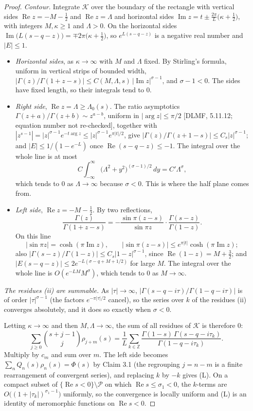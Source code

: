 \documentclass[11pt]{article}
\newcommand{\re}{\operatorname{Re}}
\newcommand{\im}{\operatorname{Im}}
\begin{document}
\begin{proof}
\emph{Contour.} Integrate $\mathcal{K}$ over the boundary of the rectangle with vertical sides $\re z=-M-\frac12$ and $\re z=\Lambda$ and horizontal sides $\im z=t\pm\frac{2\pi}{L}\bigl(\kappa+\frac12\bigr)$, with integers $M,\kappa\ge1$ and $\Lambda>0$. On the horizontal sides $\im\bigl(L(s-q-z)\bigr)=\mp2\pi\bigl(\kappa+\frac12\bigr)$, so $e^{L(s-q-z)}$ is a negative real number and $|E|\le1$.
\begin{itemize}
\item \emph{Horizontal sides}, as $\kappa\to\infty$ with $M$ and $\Lambda$ fixed. By Stirling's formula, uniform in vertical strips of bounded width, $|\Gamma(z)/\Gamma(1+z-s)|\le C(M,\Lambda,s)\,|\im z|^{\sigma-1}$, and $\sigma-1<0$. The sides have fixed length, so their integrals tend to $0$.
\item \emph{Right side}, $\re z=\Lambda\ge\Lambda_0(s)$. The ratio asymptotics $\Gamma(z+a)/\Gamma(z+b)\sim z^{a-b}$, uniform in $|\arg z|\le\pi/2$ [DLMF, 5.11.12; equation number not re-checked], together with $|z^{s-1}|=|z|^{\sigma-1}e^{-t\arg z}\le|z|^{\sigma-1}e^{\pi|t|/2}$, give $|\Gamma(z)/\Gamma(z+1-s)|\le C_s|z|^{\sigma-1}$; and $|E|\le1/(1-e^{-L})$ once $\re(s-q-z)\le-1$. The integral over the whole line is at most
\[
C\int_{-\infty}^{\infty}\bigl(\Lambda^2+y^2\bigr)^{(\sigma-1)/2}\,dy=C'\Lambda^{\sigma},
\]
which tends to $0$ as $\Lambda\to\infty$ because $\sigma<0$. This is where the half plane comes from.
\item \emph{Left side}, $\re z=-M-\frac12$. By two reflections,
\[
\frac{\Gamma(z)}{\Gamma(1+z-s)}=-\frac{\sin\pi(z-s)}{\sin\pi z}\cdot\frac{\Gamma(s-z)}{\Gamma(1-z)}.
\]
On this line
\[
|\sin\pi z|=\cosh(\pi\im z),\qquad|\sin\pi(z-s)|\le e^{\pi|t|}\cosh(\pi\im z);
\]
also $|\Gamma(s-z)/\Gamma(1-z)|\le C_s|1-z|^{\sigma-1}$, since $\re(1-z)=M+\frac32$; and $|E(s-q-z)|\le2e^{-L(\sigma-q+M+1/2)}$ for large $M$. The integral over the whole line is $O(e^{-LM}M^{\sigma})$, which tends to $0$ as $M\to\infty$.
\end{itemize}

\emph{The residues (ii) are summable.} As $|\tau|\to\infty$, $|\Gamma(s-q-i\tau)/\Gamma(1-q-i\tau)|$ is of order $|\tau|^{\sigma-1}$ (the factors $e^{-\pi|\tau|/2}$ cancel), so the series over $k$ of the residues (ii) converges absolutely, and it does so exactly when $\sigma<0$.

Letting $\kappa\to\infty$ and then $M,\Lambda\to\infty$, the sum of all residues of $\mathcal{K}$ is therefore $0$:
\[
\sum_{j\ge0}\binom{s+j-1}{j}\rho_{j+m}(s)=\frac1L\sum_{k\in\mathbb{Z}}\frac{\Gamma(1-s)\,\Gamma(s-q-i\tau_k)}{\Gamma(1-q-i\tau_k)}.
\]
Multiply by $c_m$ and sum over $m$. The left side becomes $\sum_nQ_n(s)\rho_n(s)=\Phi(s)$ by Claim 3.1 (the regrouping $j=n-m$ is a finite rearrangement of convergent series), and replacing $k$ by $-k$ gives (L). On a compact subset of $\{\re s<0\}\setminus\mathcal{P}$ on which $\re s\le\sigma_1<0$, the $k$-terms are $O\bigl((1+|\tau_k|)^{\sigma_1-1}\bigr)$ uniformly, so the convergence is locally uniform and (L) is an identity of meromorphic functions on $\re s<0$.
\end{proof}
\end{document}
